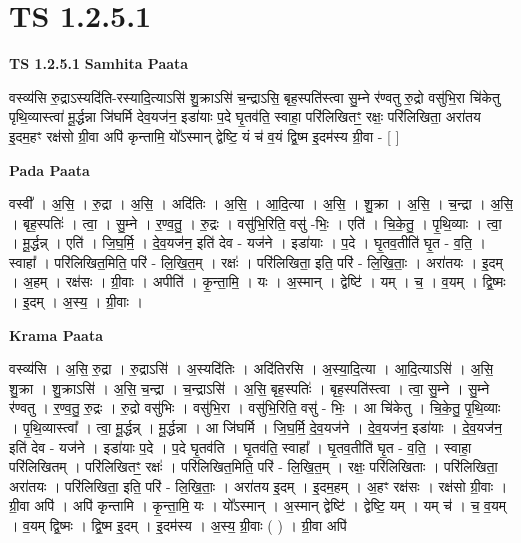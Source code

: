 \documentclass[17pt]{extarticle}
\begin{document}
\section{ TS 1.2.5.1 }

\textbf{TS 1.2.5.1 } \newline
\textbf{Samhita Paata} \newline

वस्व्य॑सि रु॒द्राऽस्यदि॑ति-रस्यादि॒त्याऽसि॑ शु॒क्राऽसि॑ च॒न्द्राऽसि॒ बृह॒स्पति॑स्त्वा सु॒म्ने र॑ण्वतु रु॒द्रो वसु॑भि॒रा चि॑केतु पृथि॒व्यास्त्वा॑ मू॒र्द्धन्ना जि॑घर्मि देव॒यज॑न॒ इडा॑याः प॒दे घृ॒तव॑ति॒ स्वाहा॒ परि॑लिखितꣳ॒॒ रक्षः॒ परि॑लिखिता॒ अरा॑तय इ॒दम॒हꣳ रक्ष॑सो ग्री॒वा अपि॑ कृन्तामि॒ यो᳚ऽस्मान् द्वेष्टि॒ यं च॑ व॒यं द्वि॒ष्म इ॒दम॑स्य ग्री॒वा - [ ] \newline

\textbf{Pada Paata} \newline

वस्वी᳚ । अ॒सि॒ । रु॒द्रा । अ॒सि॒ । अदि॑तिः । अ॒सि॒ । आ॒दि॒त्या । अ॒सि॒ । शु॒क्रा । अ॒सि॒ । च॒न्द्रा । अ॒सि॒ । बृह॒स्पतिः॑ । त्वा॒ । सु॒म्ने । र॒ण्व॒तु॒ । रु॒द्रः । वसु॑भि॒रिति॒ वसु॑ -भिः॒ । एति॑ । चि॒के॒तु॒ । पृ॒थि॒व्याः । त्वा॒ । मू॒र्द्धन्न् । एति॑ । जि॒घ॒र्मि॒ । दे॒व॒यज॑न॒ इति॑ देव - यज॑ने । इडा॑याः । प॒दे । घृ॒तव॒तीति॑ घृ॒त - व॒ति॒ । स्वाहा᳚ । परि॑लिखित॒मिति॒ परि॑ - लि॒खि॒त॒म् । रक्षः॑ । परि॑लिखिता॒ इति॒ परि॑ - लि॒खि॒ताः॒ । अरा॑तयः । इ॒दम् । अ॒हम् । रक्ष॑सः । ग्री॒वाः । अपीति॑ । कृ॒न्ता॒मि॒ । यः । अ॒स्मान् । द्वेष्टि॑ । यम् । च॒ । व॒यम् । द्वि॒ष्मः । इ॒दम् । अ॒स्य॒ । ग्री॒वाः ।  \newline


\textbf{Krama Paata} \newline

वस्व्य॑सि । अ॒सि॒ रु॒द्रा । रु॒द्राऽसि॑ । अ॒स्यदि॑तिः । अदि॑तिरसि । अ॒स्या॒दि॒त्या । आ॒दि॒त्याऽसि॑ । अ॒सि॒ शु॒क्रा । शु॒क्राऽसि॑ । अ॒सि॒ च॒न्द्रा । च॒न्द्राऽसि॑ । अ॒सि॒ बृह॒स्पतिः॑ । बृह॒स्पति॑स्त्वा । त्वा॒ सु॒म्ने । सु॒म्ने र॑ण्वतु । र॒ण्व॒तु॒ रु॒द्रः । रु॒द्रो वसु॑भिः । वसु॑भि॒रा । वसु॑भि॒रिति॒ वसु॑ - भिः॒ । आ चि॑केतु । चि॒के॒तु॒ पृ॒थि॒व्याः । पृ॒थि॒व्यास्त्वा᳚ । त्वा॒ मू॒र्द्धन्न् । मू॒र्द्धन्ना । आ जि॑घर्मि । जि॒घ॒र्मि॒ दे॒व॒यज॑ने । दे॒व॒यज॑न॒ इडा॑याः । दे॒व॒यज॑न॒ इति॑ देव - यज॑ने । इडा॑याः प॒दे । प॒दे घृ॒तव॑ति । घृ॒तव॑ति॒ स्वाहा᳚ । घृ॒तव॒तीति॑ घृ॒त - व॒ति॒ । स्वाहा॒ परि॑लिखितम् । परि॑लिखितꣳ॒॒ रक्षः॑ । परि॑लिखित॒मिति॒ परि॑ - लि॒खि॒त॒म् । रक्षः॒ परि॑लिखिताः । परि॑लिखिता॒ अरा॑तयः । परि॑लिखिता॒ इति॒ परि॑ - लि॒खि॒ताः॒ । अरा॑तय इ॒दम् । इ॒दम॒हम् । अ॒हꣳ रक्ष॑सः । रक्ष॑सो ग्री॒वाः । ग्री॒वा अपि॑ । अपि॑ कृन्तामि । कृ॒न्ता॒मि॒ यः । यो᳚ऽस्मान् । अ॒स्मान् द्वेष्टि॑ । द्वेष्टि॒ यम् । यम् च॑ । च॒ व॒यम् । व॒यम् द्वि॒ष्मः । द्वि॒ष्म इ॒दम् । इ॒दम॑स्य । अ॒स्य॒ ग्री॒वाः ( ) । ग्री॒वा अपि॑ \newline
\end{document}
